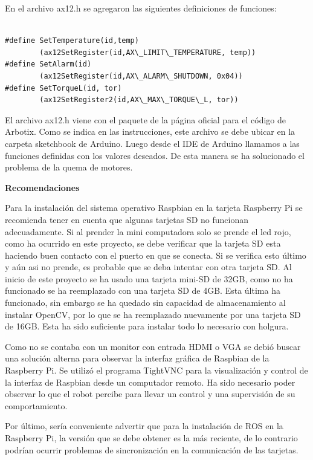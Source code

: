 \begin{itemize}
En el archivo ax12.h se agregaron las siguientes definiciones de funciones:

\begin{lstlisting}

#define SetTemperature(id,temp) 
		(ax12SetRegister(id,AX\_LIMIT\_TEMPERATURE, temp))
#define SetAlarm(id)
		(ax12SetRegister(id,AX\_ALARM\_SHUTDOWN, 0x04))
#define SetTorqueL(id, tor)
		(ax12SetRegister2(id,AX\_MAX\_TORQUE\_L, tor)) 
\end{lstlisting}
 

El archivo ax12.h viene con el paquete de la p\'agina oficial para el código de Arbotix. Como se indica en las instrucciones, este archivo se debe ubicar en la carpeta sketchbook de Arduino. Luego desde el IDE de Arduino llamamos a las funciones definidas con los valores deseados. De esta manera se ha solucionado el problema de la quema de motores.

\end{itemize}

\textbf{Recomendaciones}  

Para la instalación del sistema operativo Raspbian en la tarjeta Raspberry Pi se recomienda tener en cuenta que algunas tarjetas SD no funcionan adecuadamente. Si al prender la mini computadora solo se prende el led rojo, como ha ocurrido en este proyecto, se debe verificar que la tarjeta SD esta haciendo buen contacto con el puerto en que se conecta. Si se verifica esto último y aún asi no prende, es probable que se deba intentar con otra tarjeta SD. Al inicio de este proyecto se ha usado una tarjeta mini-SD de 32GB, como no ha funcionado se ha reemplazado con una tarjeta SD de 4GB. Esta última ha funcionado, sin embargo se ha quedado sin capacidad de almacenamiento al instalar OpenCV, por lo que se ha reemplazado nuevamente por una tarjeta SD de 16GB. Esta ha sido suficiente para instalar todo lo necesario con holgura.    

Como no se contaba con un monitor con entrada HDMI o VGA se debió buscar una solución alterna para observar la interfaz gráfica de Raspbian de la Raspberry Pi. Se utilizó el programa TightVNC para la visualización y control de la interfaz de Raspbian desde un computador remoto. Ha sido necesario poder observar lo que el robot percibe para llevar un control y una supervisión de su comportamiento. 

Por último, sería conveniente advertir que para la instalación de ROS en la Raspberry Pi, la versión que se debe obtener es la más reciente, de lo contrario podrían ocurrir problemas de sincronización en la comunicación de las tarjetas.   




